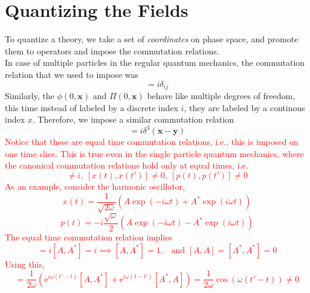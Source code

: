 \documentclass[11pt]{article}
\newcommand{\e}{\mathrm{e}}
\newcommand{\w}{\omega}
\numberwithin{equation}{section}
\begin{document}
    \section{Quantizing the Fields}
    To quantize a theory, we take a set of \textit{coordinates} on phase space, and promote them to operators and impose the commutation relations.\\
    In case of multiple particles in the regular quantum mechanics, the commutation relation that we used to impose was 
    \begin{equation*}
        [x_i, p_j] = i\delta_{ij}
    \end{equation*}
    Similarly, the \(\phi(0, \textbf{x})\) and \(\Pi(0, \textbf{x})\) behave like multiple degrees of freedom, this time instead of labeled by a discrete index \(i\), they are labeled by a continous index \(x\). Therefore, we impose a similar commutation relation
    \begin{equation}
        [\phi(t, \textbf{x}), \Pi(t, \textbf{y})] = i\delta^3(\textbf{x} - \textbf{y})
    \end{equation} 
    \textcolor{red}{
    Notice that these are equal time commutation relations, i.e., this is imposed on one time slice. This is true even in the single particle quantum mechanics, where the canonical commutation relations hold only at equal times, i.e. 
    \begin{equation*}
        [x(t), p(t')] \ne i,~[x(t), x(t')] \ne 0,~[p(t), p(t')]\ne 0
    \end{equation*}
    As an example, consider the harmonic oscillator, 
    \begin{equation*}
        x(t) = \frac{1}{\sqrt{2\w}}(A\exp(-i\w t) + A^*\exp(i\w t))
    \end{equation*}
    \begin{equation*}
        p(t) = -i\frac{\sqrt{\w}}{2}(A\exp(-i\w t) - A^*\exp(i\w t))
    \end{equation*}
    The equal time commutation relation implies 
    \begin{equation*}
        [x(0), p(0)] = i[A, A^*] = i \implies [A, A^*] = 1\text{,~~ and } [A, A] = [A^*,A^*] = 0 
    \end{equation*}
    Using this, 
    \begin{equation*}
        [x(t), x(t')] = \frac{1}{2\w}\left(\e^{i\w(t'-t)}[A, A^*] + \e^{i\w(t-t')}[A^*, A]\right) = \frac{1}{2\w}\cos(\w(t'-t)) \ne 0
        \tag{\(\diamondsuit\)}
        \label{eq:time_comm}
    \end{equation*}
    }
\end{document}
